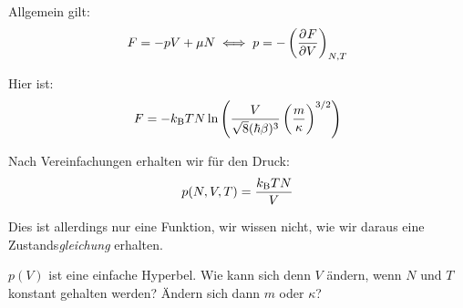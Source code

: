 Allgemein gilt:
\[
    F = - pV + \mu N
    \iff
    p = - \tdpd F V {N, T}
\]

Hier ist:
\[
    F = - \kB T N \ln\del{\frac{V}{\sqrt 8 (\hbar \beta)^3} \del{\frac{m}
        \kappa}^{3/2}}
    \]

Nach Vereinfachungen erhalten wir für den Druck:
\[
    p(N, V, T) = \frac{k_\text B T N}{V}
\]

Dies ist allerdings nur eine Funktion, wir wissen nicht, wie wir daraus eine
Zustands\emph{gleichung} erhalten.

$p(V)$ ist eine einfache Hyperbel. Wie kann sich denn $V$ ändern, wenn $N$ und
$T$ konstant gehalten werden? Ändern sich dann $m$ oder $\kappa$?


\IfFileExists{\bibliographyfile}{
    \printbibliography
}{}



